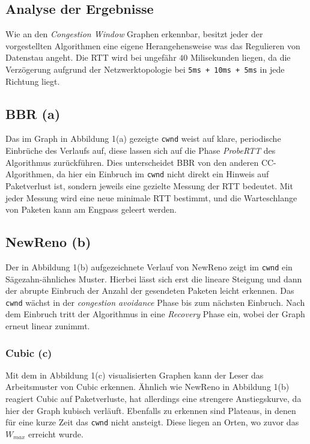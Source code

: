 \documentclass[paper=a4,fontsize=12pt,ngerman]{scrartcl}
\begin{document}
\clearpage 
\subsection{Analyse der Ergebnisse}
Wie an den \textit{Congestion Window} Graphen erkennbar, besitzt jeder 
der vorgestellten Algorithmen eine eigene Herangehensweise was  das Regulieren 
von Datenstau angeht.
Die RTT wird bei ungefähr $40$ Milisekunden liegen, da die Verzögerung aufgrund
der Netzwerktopologie bei \texttt{5ms + 10ms + 5ms} in jede Richtung liegt. 

\subsection*{BBR (a)}

Das im Graph in Abbildung 1(a) gezeigte \texttt{cwnd} weist auf klare, periodische Einbrüche des Verlaufs auf, diese lassen
sich auf die Phase \textit{ProbeRTT} des Algorithmus zurückführen. Dies unterscheidet BBR von den anderen
CC-Algorithmen, da hier ein Einbruch im \texttt{cwnd} nicht direkt ein Hinweis auf Paketverlust ist, sondern jeweils eine 
gezielte Messung der RTT bedeutet. Mit jeder Messung wird eine neue minimale RTT bestimmt, und die Warteschlange von Paketen
kann am Engpass geleert werden.

\subsection*{NewReno (b)}

Der in Abbildung 1(b) aufgezeichnete Verlauf von NewReno zeigt im \texttt{cwnd} ein Sägezahn-ähnliches Muster. Hierbei lässt sich erst
die lineare Steigung und dann der abrupte Einbruch der Anzahl der gesendeten Paketen leicht erkennen.
Das \texttt{cwnd} wächst in der \textit{congestion avoidance} Phase bis zum nächsten Einbruch.
Nach dem Einbruch tritt der Algorithmus in eine \textit{Recovery} Phase ein, wobei der Graph erneut linear zunimmt.

\subsubsection*{Cubic (c)}

Mit dem in Abbildung 1(c) visualisierten Graphen kann der Leser das Arbeitsmuster von Cubic erkennen.
Ähnlich wie NewReno in Abbildung 1(b) reagiert Cubic auf Paketverluste, hat allerdings eine strengere Anstiegskurve,
da hier der Graph kubisch verläuft. Ebenfalls zu erkennen sind Plateaus, in denen für eine kurze Zeit das 
\texttt{cwnd} nicht ansteigt. Diese liegen an Orten, wo zuvor das $W_{max}$ erreicht wurde.
\end{document}
